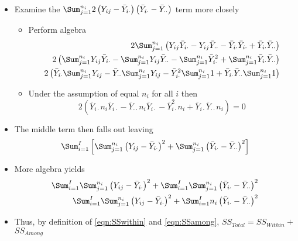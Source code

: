 \begin{itemize}
  \item Examine the $\Sum_{j=1}^{n_{i}}2\left(Y_{ij}-\bar{Y}_{i\cdot}\right)\left(\bar{Y}_{i\cdot}-\bar{Y}_{\cdot\cdot}\right)$ term more closely
    \begin{itemize}
      \item Perform algebra
        \[ \begin{split}
          2\Sum_{j=1}^{n_{i}}\left(Y_{ij}\bar{Y}_{i\cdot}-Y_{ij}\bar{Y}_{\cdot\cdot}-\bar{Y}_{i\cdot}\bar{Y}_{i\cdot}+\bar{Y}_{i\cdot}\bar{Y}_{\cdot\cdot}\right) \\
          2\left(\Sum_{j=1}^{n_{i}}Y_{ij}\bar{Y}_{i\cdot}-\Sum_{j=1}^{n_{i}}Y_{ij}\bar{Y}_{\cdot\cdot}-\Sum_{j=1}^{n_{i}}\bar{Y}_{i\cdot}^{2}+\Sum_{j=1}^{n_{i}}\bar{Y}_{i\cdot}\bar{Y}_{\cdot\cdot}\right) \\
          2\left(\bar{Y}_{i\cdot}\Sum_{j=1}^{n_{i}}Y_{ij}-\bar{Y}_{\cdot\cdot}\Sum_{j=1}^{n_{i}}Y_{ij}-\bar{Y}_{i\cdot}^{2}\Sum_{j=1}^{n_{i}}1+\bar{Y}_{i\cdot}\bar{Y}_{\cdot\cdot}\Sum_{j=1}^{n_{i}}1\right) \\
        \end{split} \]
      \item Under the assumption of equal $n_{i}$ for all $i$ then
        \[ 2\left(\bar{Y}_{i\cdot}n_{i}\bar{Y}_{i\cdot}-\bar{Y}_{\cdot\cdot}n_{i}\bar{Y}_{i\cdot}-\bar{Y}_{i\cdot}^{2}n_{i}+\bar{Y}_{i\cdot}\bar{Y}_{\cdot\cdot}n_{i} \right) = 0 \]
    \end{itemize}

  \item The middle term then falls out leaving
    \[ \Sum_{i=1}^{I}\left[\Sum_{j=1}^{n_{i}}\left(Y_{ij}-\bar{Y}_{i\cdot}\right)^{2}+\Sum_{j=1}^{n_{i}}\left(\bar{Y}_{i\cdot}-\bar{Y}_{\cdot\cdot}\right)^{2}\right]  \]
  \item More algebra yields
    \[ \begin{split}
      \Sum_{i=1}^{I}\Sum_{j=1}^{n_{i}}\left(Y_{ij}-\bar{Y}_{i\cdot}\right)^{2}+\Sum_{i=1}^{I}\Sum_{j=1}^{n_{i}}\left(\bar{Y}_{i\cdot}-\bar{Y}_{\cdot\cdot}\right)^{2} \\
      \Sum_{i=1}^{I}\Sum_{j=1}^{n_{i}}\left(Y_{ij}-\bar{Y}_{i\cdot}\right)^{2}+\Sum_{i=1}^{I}n_{i}\left(\bar{Y}_{i\cdot}-\bar{Y}_{\cdot\cdot}\right)^{2}
    \end{split} \]
  \item Thus, by definition of \eqref{eqn:SSwithin} and \eqref{eqn:SSamong}, $SS_{Total}=$$SS_{Within}+$$SS_{Among}$
\end{itemize}


